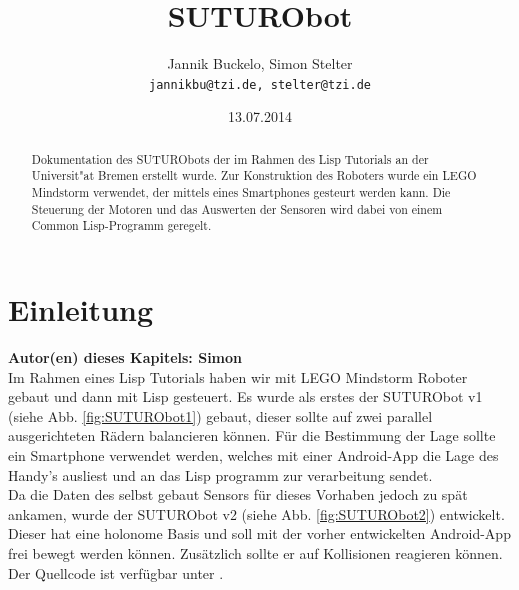 \documentclass[8pt]{article}
\makeatletter
\newcommand{\secauthor}[1]{\textbf{Autor(en) dieses Kapitels: {#1}}\\}
\newcommand{\coursename}{\@empty}
\newcommand{\groupno}{\@empty}
\newcommand{\beginsheet}{\clearscrheadfoot\ihead[]{Kurs: \coursename}\ohead[]{Gruppe \groupno}\ofoot[]{\pagemark}\ifoot[]{}}
\makeatother
\begin{document}
\beginsheet

\title{SUTURObot}
\author{Jannik Buckelo, Simon Stelter\\ 
\texttt{jannikbu@tzi.de, stelter@tzi.de}}
\date{13.07.2014}
\maketitle




\begin{abstract}
Dokumentation des SUTURObots der im Rahmen des Lisp Tutorials an der Universit"at Bremen erstellt wurde. Zur Konstruktion des Roboters wurde ein LEGO Mindstorm verwendet, der mittels eines Smartphones gesteurt werden kann. Die Steuerung der Motoren und das Auswerten der Sensoren wird dabei von einem Common Lisp-Programm geregelt.	
\end{abstract}

\section{Einleitung} 
\secauthor{Simon}
Im Rahmen eines Lisp Tutorials haben wir mit LEGO Mindstorm Roboter gebaut und dann mit Lisp gesteuert. Es wurde als erstes der SUTURObot v1 (siehe Abb. \ref{fig:SUTURObot1}) gebaut, dieser sollte auf zwei parallel ausgerichteten Rädern balancieren können. Für die Bestimmung der Lage sollte ein Smartphone verwendet werden, welches mit einer Android-App die Lage des Handy's ausliest und an das Lisp programm zur verarbeitung sendet.\\
Da die Daten des selbst gebaut Sensors für dieses Vorhaben jedoch zu spät ankamen, wurde der SUTURObot v2 (siehe Abb. \ref{fig:SUTURObot2}) entwickelt. Dieser hat eine holonome Basis und soll mit der vorher entwickelten Android-App frei bewegt werden können. Zusätzlich sollte er auf Kollisionen reagieren können.\\
Der Quellcode ist verfügbar unter \cite{Code}.
\end{document}
